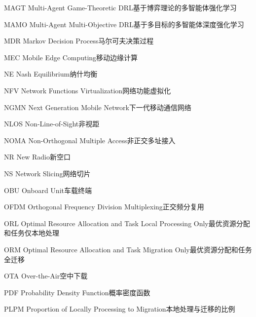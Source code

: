 \begin{abbreviate}[0mm][18mm]
\item[MAGT] Multi-Agent Game-Theoretic DRL\hspace{1em}基于博弈理论的多智能体强化学习
\item[MAMO] Multi-Agent Multi-Objective DRL\hspace{1em}基于多目标的多智能体深度强化学习
\item[MDR] Markov Decision Process\hspace{1em}马尔可夫决策过程
\item[MEC] Mobile Edge Computing\hspace{1em}移动边缘计算
\item[NE] Nash Equilibrium\hspace{1em}纳什均衡
\item[NFV] Network Functions Virtualization\hspace{1em}网络功能虚拟化
\item[NGMN] Next Generation Mobile Network\hspace{1em}下一代移动通信网络
\item[NLOS] Non-Line-of-Sight\hspace{1em}非视距
\item[NOMA] Non-Orthogonal Multiple Access\hspace{1em}非正交多址接入
\item[NR] New Radio\hspace{1em}新空口
\item[NS] Network Slicing\hspace{1em}网络切片
\item[OBU] Onboard Unit\hspace{1em}车载终端
\item[OFDM] Orthogonal Frequency Division Multiplexing\hspace{1em}正交频分复用
\item[ORL] Optimal Resource Allocation and Task Local Processing Only\hspace{1em}最优资源分配和任务仅本地处理
\item[ORM] Optimal Resource Allocation and Task Migration Only\hspace{1em}最优资源分配和任务全迁移
\item[OTA] Over-the-Air\hspace{1em}空中下载
\item[PDF] Probability Density Function\hspace{1em}概率密度函数
\item[PLPM] Proportion of Locally Processing to Migration\hspace{1em}本地处理与迁移的比例

\end{abbreviate}
